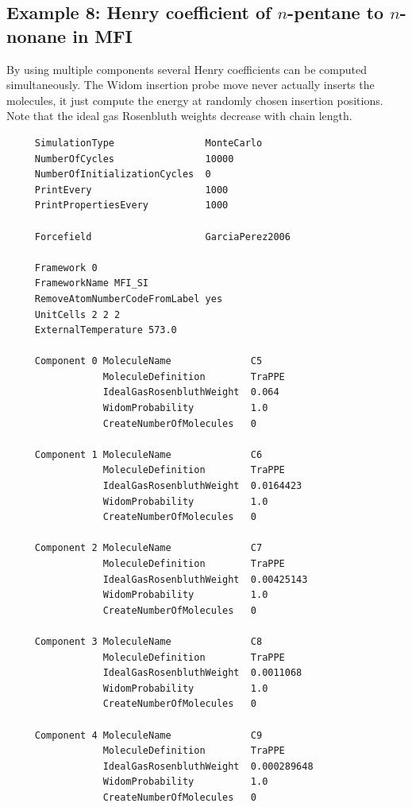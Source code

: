 \subsection*{Example 8: Henry coefficient of $n$-pentane to $n$-nonane in MFI}

By using multiple components several Henry coefficients can be computed simultaneously. The Widom insertion probe move
never actually inserts the molecules, it just compute the energy at randomly chosen insertion positions.
Note that the ideal gas Rosenbluth weights decrease with chain length.

\begin{tiny}
\begin{verbatim}
     SimulationType                MonteCarlo
     NumberOfCycles                10000
     NumberOfInitializationCycles  0
     PrintEvery                    1000
     PrintPropertiesEvery          1000
     
     Forcefield                    GarciaPerez2006
     
     Framework 0
     FrameworkName MFI_SI
     RemoveAtomNumberCodeFromLabel yes
     UnitCells 2 2 2
     ExternalTemperature 573.0
     
     Component 0 MoleculeName              C5
                 MoleculeDefinition        TraPPE
                 IdealGasRosenbluthWeight  0.064
                 WidomProbability          1.0
                 CreateNumberOfMolecules   0
     
     Component 1 MoleculeName              C6
                 MoleculeDefinition        TraPPE
                 IdealGasRosenbluthWeight  0.0164423
                 WidomProbability          1.0
                 CreateNumberOfMolecules   0
     
     Component 2 MoleculeName              C7
                 MoleculeDefinition        TraPPE
                 IdealGasRosenbluthWeight  0.00425143
                 WidomProbability          1.0
                 CreateNumberOfMolecules   0
     
     Component 3 MoleculeName              C8
                 MoleculeDefinition        TraPPE
                 IdealGasRosenbluthWeight  0.0011068
                 WidomProbability          1.0
                 CreateNumberOfMolecules   0
     
     Component 4 MoleculeName              C9
                 MoleculeDefinition        TraPPE
                 IdealGasRosenbluthWeight  0.000289648
                 WidomProbability          1.0
                 CreateNumberOfMolecules   0
\end{verbatim}
\end{tiny}

